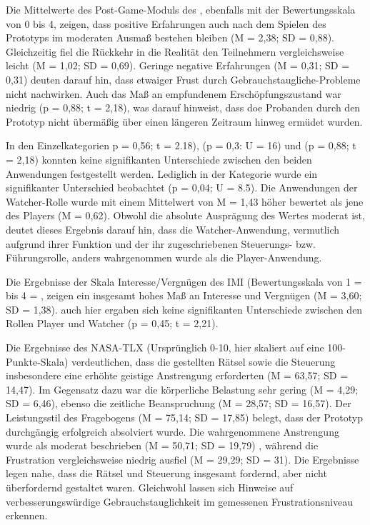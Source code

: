 Die Mittelwerte des Post-Game-Moduls des , ebenfalls mit der Bewertungsskala von 0 bis 4, zeigen, dass positive Erfahrungen auch nach dem Spielen des Prototyps im moderaten Ausmaß bestehen bleiben (M = 2,38; SD = 0,88). Gleichzeitig fiel die Rückkehr in die Realität den Teilnehmern vergleichsweise leicht (M = 1,02; SD = 0,69). Geringe negative Erfahrungen (M = 0,31; SD = 0,31) deuten darauf hin, dass etwaiger Frust durch Gebrauchstaugliche-Probleme nicht nachwirken. Auch das Maß an empfundenem Erschöpfungszustand war niedrig (p = 0,88; t = 2,18), was darauf hinweist, dass doe Probanden durch den Prototyp nicht übermäßig über einen längeren Zeitraum hinweg ermüdet wurden.

In den Einzelkategorien  p = 0,56; t = 2.18),  (p = 0,3: U = 16) und  (p = 0,88; t = 2,18) konnten keine signifikanten Unterschiede zwischen den beiden Anwendungen festgestellt werden. Lediglich in der Kategorie  wurde ein signifikanter Unterschied beobachtet (p = 0,04; U = 8.5). Die Anwendungen der Watcher-Rolle wurde mit einem Mittelwert von M = 1,43 höher bewertet als jene des Players (M = 0,62). Obwohl die absolute Ausprägung des Wertes moderat ist, deutet dieses Ergebnis darauf hin, dass die Watcher-Anwendung, vermutlich aufgrund ihrer Funktion und der ihr zugeschriebenen Steuerungs- bzw. Führungsrolle, anders wahrgenommen wurde als die Player-Anwendung.

Die Ergebnisse der Skala Interesse/Vergnügen des \ac{IMI} (Bewertungsskala von 1 =  bis 4 = , zeigen ein insgesamt hohes Maß an Interesse und Vergnügen (M = 3,60; SD = 1,38). auch hier ergaben sich keine signifikanten Unterschiede zwischen den Rollen Player und Watcher (p = 0,45; t = 2,21). 

Die Ergebnisse des \ac{NASA-TLX} (Ursprünglich 0-10, hier skaliert auf eine 100-Punkte-Skala) verdeutlichen, dass die gestellten Rätsel sowie die Steuerung insbesondere eine erhöhte geistige Anstrengung erforderten (M = 63,57; SD = 14,47). Im Gegensatz dazu war die körperliche Belastung sehr gering  (M = 4,29; SD = 6,46), ebenso die zeitliche Beanspruchung (M = 28,57; SD = 16,57). Der Leistungsstil des Fragebogens (M = 75,14; SD = 17,85) belegt, dass der Prototyp durchgängig erfolgreich absolviert wurde. Die wahrgenommene Anstrengung wurde als moderat beschrieben (M = 50,71; SD = 19,79) , während die Frustration vergleichsweise niedrig ausfiel  (M = 29,29; SD = 31). Die Ergebnisse legen nahe, dass die Rätsel und Steuerung insgesamt fordernd, aber nicht überfordernd gestaltet waren. Gleichwohl lassen sich Hinweise auf verbesserungswürdige Gebrauchstauglichkeit im gemessenen Frustrationsniveau erkennen.

